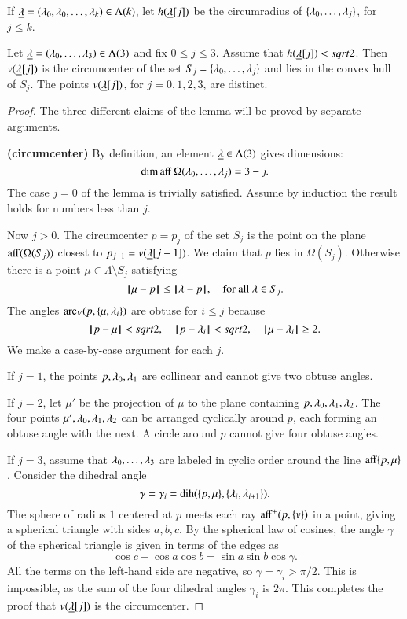 \begin{definition}[h]
If ${\underline{\lambda}}=(\lambda_0,\lambda_0,\ldots,\lambda_k)\in\Lambda(k)$, 
let $h({\underline{\lambda}}[j])$ be the circumradius of $\{\lambda_0,\ldots,\lambda_j\}$, for $j\le k$.
\end{definition}

\begin{lemma}\label{lemma:v2} Let ${\underline{\lambda}}=(\lambda_0,\ldots,\lambda_3)\in\Lambda(3)$ and fix $0\le j\le 3$.  Assume that $h({\underline{\lambda}}[j])<sqrt2$.
Then $v({\underline{\lambda}}[j])$ is the circumcenter of the set $S_j =\{\lambda_0,\ldots,\lambda_j\}$ and lies in the convex hull of $S_j$.  The points $v({\underline{\lambda}}[j])$, for $j=0,1,2,3$, are distinct.
\end{lemma}

\begin{proof} The three different claims of the lemma will be proved by separate arguments.

{\bf (circumcenter)} By definition, an element ${\underline{\lambda}}\in\Lambda(3)$ gives dimensions: 
$$\operatorname{dim\,aff}\Omega(\lambda_0,\ldots,\lambda_j) = 3-j.$$  The case $j=0$ of the lemma is trivially
satisfied.  Assume by induction the result holds for numbers less than $j$.

Now $j>0$.
The circumcenter $p=p_{j}$ of the set $S_{j}$ is the point on the plane ${\operatorname{aff}}(\Omega(S_{j}))$
closest to $p_{j-1}=v({\underline{\lambda}}[j-1])$.  We claim that $p$ lies in $\Omega(S_{j})$.  Otherwise
there is a point $\mu\in\Lambda\setminus S_j$ satisfying
\begin{equation}\label{eqn:closest}
{\hskip0.1em|\hskip-0.15em|\hskip0.1em}\mu - p{\hskip0.1em|\hskip-0.15em|\hskip0.1em}\le {\hskip0.1em|\hskip-0.15em|\hskip0.1em}\lambda - p{\hskip0.1em|\hskip-0.15em|\hskip0.1em}, \quad\text{for all } \lambda\in S_j.
\end{equation}
The angles $\operatorname{arc}_V(p,\{\mu,\lambda_i\})$ are obtuse for $i\le j$ because
$$
{\hskip0.1em|\hskip-0.15em|\hskip0.1em}p - \mu{\hskip0.1em|\hskip-0.15em|\hskip0.1em} < sqrt2,\quad {\hskip0.1em|\hskip-0.15em|\hskip0.1em}p - \lambda_i{\hskip0.1em|\hskip-0.15em|\hskip0.1em} <sqrt2,\quad {\hskip0.1em|\hskip-0.15em|\hskip0.1em}\mu - \lambda_i{\hskip0.1em|\hskip-0.15em|\hskip0.1em} \ge 2.
$$ 
We make a case-by-case argument for each $j$.

If $j=1$, the points $p,\lambda_0,\lambda_1$ are collinear and cannot give two obtuse angles.

If $j=2$, let $\mu'$ be the projection of $\mu$ to the plane containing
$p,\lambda_0,\lambda_1,\lambda_2$. The four points $\mu',\lambda_0,\lambda_1,\lambda_2$ can be arranged
cyclically around $p$, each forming an obtuse angle with the next.  A circle around $p$
cannot give four obtuse angles.


If $j=3$, assume that $\lambda_0,\ldots,\lambda_3$ are labeled in cyclic order around the line
${\operatorname{aff}}\{p,\mu\}$.  Consider the dihedral angle 
  $$
  \gamma=\gamma_i=\operatorname{dih}(\{p,\mu\},\{\lambda_i,\lambda_{i+1}\}).
  $$
The sphere of radius $1$ centered at $p$ meets each ray
${\operatorname{aff}}^+(p,\{v\})$ in a point, giving a spherical triangle with sides $a,b,c$.  By the spherical law of cosines, the angle $\gamma$ of the spherical triangle is given in terms of the edges as
$$
  \cos c - \cos a \cos b = \sin a \sin b \cos \gamma.
$$
All the terms on the left-hand side are negative, so $\gamma =\gamma_i > \pi/2$.
This is impossible, as the sum of the four dihedral angles $\gamma_i$ is $2\pi$.
This completes the proof that $v({\underline{\lambda}}[j])$ is the circumcenter.


\end{proof}
